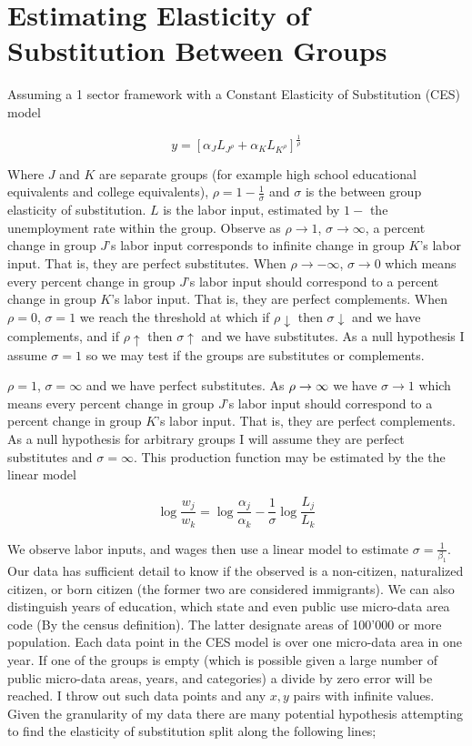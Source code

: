 \documentclass[11pt]{article}
\theoremstyle{definition}
\theoremstyle{remark}
\def\a{\alpha}
\def\b{\beta}
\def\r{\rho}
\def\s{\sigma}
\begin{document}
\section{Estimating Elasticity of Substitution Between Groups}

Assuming a 1 sector framework with a Constant Elasticity of Substitution (CES)
model

\begin{equation}
    y = [\a_J L_{J^\r} + \a_K L_{K^\r}]^{\frac 1\r}
\end{equation}

Where $J$ and $K$ are separate groups (for example high school educational
equivalents and college equivalents), $\r = 1-\frac1\s$ and $\s$ is the
between group elasticity of substitution.
$L$ is the labor input, estimated by $1-$ the unemployment rate within the group.
Observe as $\r\to 1$, $\s \to \infty$, a percent change in group $J$'s labor
input corresponds to infinite change in group $K$'s labor input. That is, they
are perfect substitutes.
When $\r\to-\infty$, $\s \to 0$ which means every percent change in group $J$'s
labor input should correspond to a percent change in group $K$'s labor input.
That is, they are perfect complements.
When $\r = 0$, $\s = 1$ we reach the threshold at which if $\r \downarrow$
then $\s\downarrow$ and we have complements, and if $\r\uparrow$ then $\s \uparrow$
and we have substitutes. As a null hypothesis I assume $\s=1$ so we may test
if the groups are substitutes or complements.

 $\r = 1$, $\s = \infty$ and we have perfect substitutes. As
$\r\to\-\infty$ we have $\s \to 1$ which means every percent change in group $J$'s
labor input should correspond to a percent change in group $K$'s labor input.
That is, they are perfect complements. As a null hypothesis for arbitrary groups
I will assume they are perfect substitutes and $\s = \infty$.
This production function may be estimated by the the linear model

\begin{equation}
    \log \frac{w_j}{w_k} = \log\frac{\a_j}{\a_k} - \frac 1\s \log\frac{L_j}{L_k}
\end{equation}

We observe labor inputs, and wages then use a linear model to estimate
$\s = \frac 1{\b_1}$. Our data has sufficient detail to know if the observed
is a non-citizen, naturalized citizen, or born citizen (the former two are
considered immigrants). We can also distinguish years of education, which state
and even public use micro-data area code (By the census definition).
The latter designate areas of 100'000 or more population.
Each data point in the CES model is over one micro-data area in one year.
If one of the groups is empty (which is possible given a large number of public
micro-data areas, years, and categories) a divide by zero error will be reached.
I throw out such data points and any $x,y$ pairs with infinite values.
Given the granularity of my data there are many potential hypothesis attempting
to find the elasticity of
substitution split along the following lines;
\end{document}
